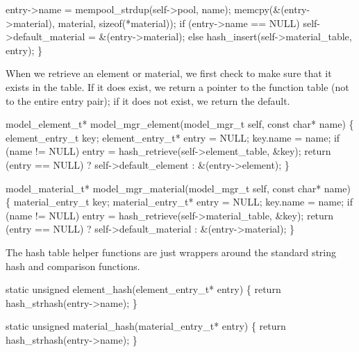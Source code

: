    entry->name = mempool_strdup(self->pool, name);
    memcpy(&(entry->material), material, sizeof(*material));
    if (entry->name == NULL)
        self->default_material = &(entry->material);
    else
        hash_insert(self->material_table, entry);
\}

\nwendcode{}\nwdocspar

When we retrieve an element or material, we first check to make
sure that it exists in the table.  If it does exist, we return
a pointer to the function table (not to the entire entry pair);
if it does not exist, we return the default.

\nwenddocs{}\plusendmoddef
model_element_t* model_mgr_element(model_mgr_t self, const char* name)
\{
    element_entry_t key;
    element_entry_t* entry = NULL;
    key.name = name;
    if (name != NULL)
        entry = hash_retrieve(self->element_table, &key);
    return (entry == NULL) ? self->default_element : &(entry->element);
\}

\nwendcode{}\nwdocspar

\nwenddocs{}\plusendmoddef
model_material_t* model_mgr_material(model_mgr_t self, const char* name)
\{
    material_entry_t key;
    material_entry_t* entry = NULL;
    key.name = name;
    if (name != NULL)
        entry = hash_retrieve(self->material_table, &key);
    return (entry == NULL) ? self->default_material : &(entry->material);
\}

\nwendcode{}\nwdocspar

The hash table helper functions are just wrappers around
the standard string hash and comparison functions.

\nwenddocs{}\endmoddef
static unsigned element_hash(element_entry_t* entry)
\{
    return hash_strhash(entry->name);
\}

static unsigned material_hash(material_entry_t* entry)
\{
    return hash_strhash(entry->name);
\}

\nwendcode{}\nwdocspar

